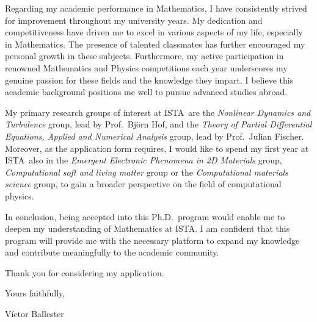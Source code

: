 \documentclass{letter}
\newcommand{\uni}{ISTA}
\begin{document}
\begin{letter}
  Regarding my academic performance in Mathematics, I have consistently strived for improvement throughout my university years. My dedication and competitiveness have driven me to excel in various aspects of my life, especially in Mathematics. The presence of talented classmates has further encouraged my personal growth in these subjects. Furthermore, my active participation in renowned Mathematics and Physics competitions each year underscores my genuine passion for these fields and the knowledge they impart. I believe this academic background positions me well to pursue advanced studies abroad.

  My primary research groups of interest at \uni\ are the \emph{Nonlinear Dynamics and Turbulence} group, lead by Prof.\ Björn Hof, and the \emph{Theory of Partial Differential Equations, Applied and Numerical Analysis} group, lead by Prof.\ Julian Fischer. Moreover, as the application form requires, I would like to spend my first year at \uni\ also in the \emph{Emergent Electronic Phenomena in 2D Materials} group, \emph{Computational soft and living matter} group or the \emph{Computational materials science} group, to gain a broader perspective on the field of computational physics.

  In conclusion, being accepted into this Ph.D.\ program would enable me to deepen my understanding of Mathematics at \uni. I am confident that this program will provide me with the necessary platform to expand my knowledge and contribute meaningfully to the academic community.

  Thank you for considering my application.
  \bigskip

  Yours faithfully,

  Víctor Ballester

\end{letter}
\end{document}
